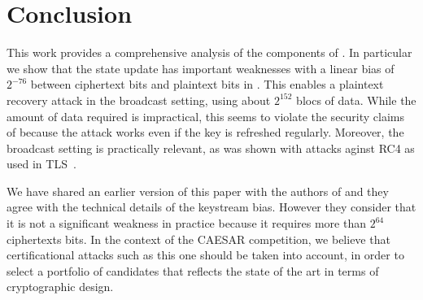 
\section{Conclusion}
\label{sec/Conclusion}

This work provides a comprehensive analysis of the components of
\MORUS.  In particular we show that the state update has important
weaknesses with a linear bias of $2^{-76}$ between ciphertext bits and
plaintext bits in \MORUS[1280].  This enables a plaintext recovery
attack in the broadcast setting, using about $2^{152}$ blocs of data.
While the amount of data required is impractical, this seems to
violate the security claims of \MORUS[1280] because the attack works
even if the key is refreshed regularly.  Moreover, the broadcast
setting is practically relevant, as was shown with attacks aginst RC4
as used in TLS~\cite{DBLP:conf/uss/AlFardanBPPS13}.

We have shared an earlier version of this paper with the authors of
\MORUS and they agree with the technical details of the keystream
bias.  However they consider that it is not a significant weakness in
practice because it requires more than $2^{64}$ ciphertexts bits.  In
the context of the CAESAR competition, we believe that certificational
attacks such as this one should be taken into account, in order to
select a portfolio of candidates that reflects the state of the art in
terms of cryptographic design.


